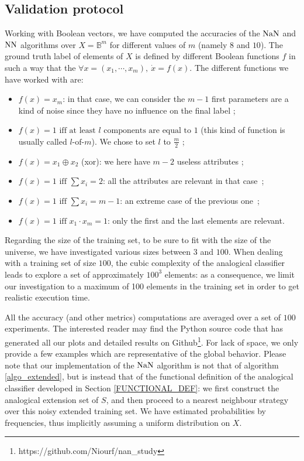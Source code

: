 \subsection{Validation protocol}
Working with Boolean vectors, we have computed the accuracies of the $\mbox{NaN}$ and
$\mbox{NN}$ algorithms over $X=\mathbb{B}^m$ for different values of $m$ (namely $8$
and $10$). The ground truth label of elements of $X$ is
defined by different Boolean functions $f$ in such a way that the $\forall x =
(x_1, \cdots, x_m), ~ \dot{x} = f(x)$. The different functions we have worked
with are:
\begin{itemize}
\item $f(x)=x_m$: in that case, we can consider the $m-1$ first
  parameters are a kind of noise since they have no influence on the final
  label ;
\item $f(x) = 1 \mbox{ iff at least } l  \mbox{ components are equal
  to } 1$ (this kind of function is usually called $l\text{-of-}m$). We chose
  to set $l$ to $\frac{m}{2}$ ;
\item $f(x)= x_1 \oplus  x_2$ (xor): we here have $m-2$ useless attributes ;
\item $f(x)=1 \mbox { iff } \sum x_i =2$: all the attributes are relevant in
  that case~;
\item $f(x)=1 \mbox { iff } \sum x_i = m-1$: an extreme case of
  the previous one~;
\item $f(x)=1 \mbox { iff } x_1 \cdot x_m = 1$: only the first and
  the last elements are relevant.
\end{itemize}

Regarding the size of the training set, to be sure to fit with the size of the
universe, we have investigated various sizes between $3$ and $100$. When
dealing with a training set of size $100$, the cubic complexity of the
analogical classifier leads to explore a set of approximately $100^3$ elements:
as a consequence, we limit our investigation to a maximum of 100 elements in
the training set in order to get realistic execution time.

All the accuracy (and other metrics) computations are averaged over a set of
$100$ experiments.  The interested reader may find the Python source code that
has generated all our plots and detailed results on
Github\footnote{https://github.com/Niourf/nan\_study}. For lack of space,
we only provide a few examples which are representative of the global behavior.
Please note that our implementation of the $\mbox{NaN}$ algorithm is not that of
algorithm \ref{algo_extended}, but is instead that of the functional definition
of the analogical classifier developed in Section \ref{FUNCTIONAL_DEF}: we
first construct the analogical extension set of $S$, and then proceed to a
nearest neighbour strategy over this noisy extended training set. We have
estimated probabilities by frequencies, thus implicitly assuming a uniform
distribution on $X$.


